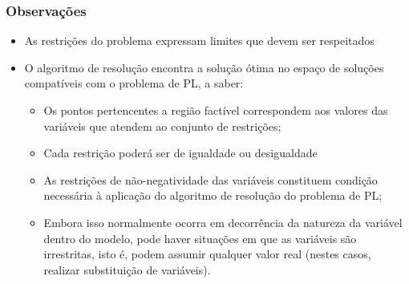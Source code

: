 \documentclass{beamer}
\begin{document}
\begin{frame}
	\frametitle{Observações}
	\begin{itemize}
	\item As restrições do problema expressam limites que devem ser respeitados
	\item {O algoritmo de resolução encontra a solução ótima no espaço de soluções compatíveis com o problema de PL, a saber:}
		\begin{itemize}
		\item Os pontos pertencentes a região factível correspondem aos valores das variáveis que atendem ao conjunto de restrições;
		\item Cada restrição poderá ser de igualdade ou desigualdade
		\item As restrições de não-negatividade das variáveis constituem condição necessária à aplicação do algoritmo de resolução do problema de PL;
		\item Embora isso normalmente ocorra em decorrência da natureza da variável dentro do modelo, pode haver situações em que as variáveis são irrestritas, isto é, podem assumir qualquer valor real (nestes casos, realizar substituição de variáveis).
		\end{itemize}
	\end{itemize}
\end{frame}
\end{document}
